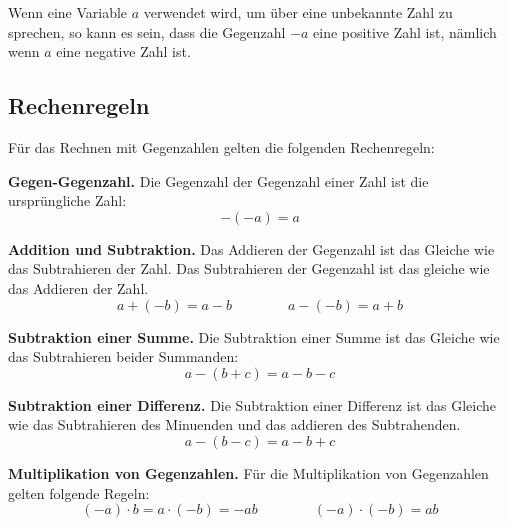 Wenn eine Variable $a$ verwendet wird, um über eine unbekannte Zahl zu sprechen, so kann es sein, dass die Gegenzahl $-a$ eine positive Zahl ist, nämlich wenn $a$ eine negative Zahl ist.

\subsection{Rechenregeln}

Für das Rechnen mit Gegenzahlen gelten die folgenden Rechenregeln:

\begin{theorem}
  \textbf{Gegen-Gegenzahl.} Die Gegenzahl der Gegenzahl einer Zahl ist die ursprüngliche Zahl:
  \[
    -(-a) = a
  \]
\end{theorem}

\begin{theorem}
  \textbf{Addition und Subtraktion.} Das Addieren der Gegenzahl ist das Gleiche wie das Subtrahieren der Zahl. Das Subtrahieren der Gegenzahl ist das gleiche wie das Addieren der Zahl.
  \[
    a+(-b) = a-b \qquad\qquad a-(-b) = a+b
  \]
\end{theorem}

\begin{theorem}
  \textbf{Subtraktion einer Summe.} Die Subtraktion einer Summe ist das Gleiche wie das Subtrahieren beider Summanden:
  \[
    a-(b+c) = a-b-c
  \]
\end{theorem}

\begin{theorem}
  \textbf{Subtraktion einer Differenz.} Die Subtraktion einer Differenz ist das Gleiche wie das Subtrahieren des Minuenden und das addieren des Subtrahenden.
  \[
    a-(b-c) = a-b+c
  \]
\end{theorem}

\begin{theorem}
  \textbf{Multiplikation von Gegenzahlen.} Für die Multiplikation von Gegenzahlen gelten folgende Regeln:
  \[
    (-a)\cdot b = a\cdot(-b) = -ab \qquad\qquad  (-a)\cdot(-b) = ab
  \]
\end{theorem}
